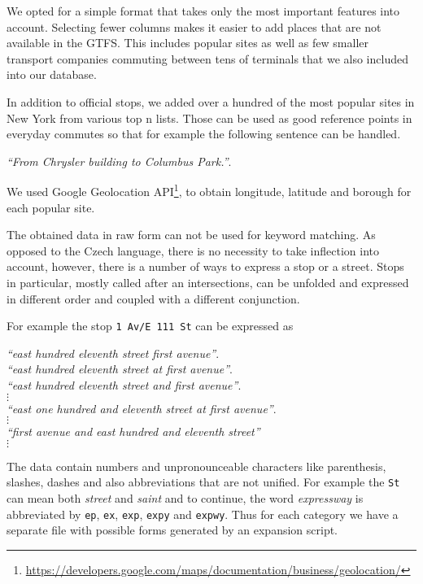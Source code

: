 We opted for a simple format that takes only the most important features into account.
Selecting fewer columns makes it easier to add places that are not available in the GTFS.
This includes popular sites as well as few smaller transport companies commuting between tens of terminals that we also included into our database.

In addition to official stops, we added over a hundred of the most popular sites in New York from various top n lists.
Those can be used as good reference points in everyday commutes so that for example the following sentence can be handled.

\begin{flushleft}
\textit{``From Chrysler building to Columbus Park.''}.
\end{flushleft}

\noindent We used Google Geolocation API\footnote{\url{https://developers.google.com/maps/documentation/business/geolocation/}}, to obtain longitude, latitude and borough for each popular site.

The obtained data in raw form can not be used for keyword matching. As opposed to the Czech language, there is no necessity to take inflection into account, however, there is a number of ways to express a stop or a street.
Stops in particular, mostly called after an intersections, can be unfolded and expressed in different order and coupled with a different conjunction.

For example the stop \texttt{1 Av/E 111 St} can be expressed as
\begin{flushleft}
\textit{``east hundred eleventh street first avenue''}. \\
\textit{``east hundred eleventh street at first avenue''}. \\
\textit{``east hundred eleventh street and first avenue''}. \\
\hspace{8em} $\vdots$ \\
\textit{``east one hundred and eleventh street at first avenue''}. \\
\hspace{8em} $\vdots$ \\
\textit{``first avenue and east hundred and eleventh street''} \\
\hspace{8em} $\vdots$
\end{flushleft}

The data contain numbers and unpronounceable characters like parenthesis, slashes, dashes and also abbreviations that are not unified.
For example the \texttt{St} can mean both \textit{street} and \textit{saint} and to continue, the word \textit{expressway} is abbreviated by \texttt{ep}, \texttt{ex}, \texttt{exp}, \texttt{expy} and \texttt{expwy}.
Thus for each category we have a separate file with possible forms generated by an expansion script.

